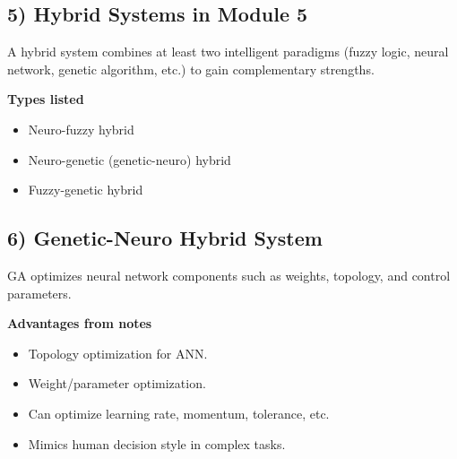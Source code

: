 \documentclass[11pt,a4paper]{article}
\begin{document}
\begin{center}
\end{center}

\subsection*{5) Hybrid Systems in Module 5}
A hybrid system combines at least two intelligent paradigms (fuzzy logic, neural network, genetic algorithm, etc.) to gain complementary strengths.

\textbf{Types listed}
\begin{itemize}
\item Neuro-fuzzy hybrid
\item Neuro-genetic (genetic-neuro) hybrid
\item Fuzzy-genetic hybrid
\end{itemize}

\subsection*{6) Genetic-Neuro Hybrid System}
GA optimizes neural network components such as weights, topology, and control parameters.

\begin{center}
\end{center}

\textbf{Advantages from notes}
\begin{itemize}
\item Topology optimization for ANN.
\item Weight/parameter optimization.
\item Can optimize learning rate, momentum, tolerance, etc.
\item Mimics human decision style in complex tasks.
\end{itemize}
\end{document}
